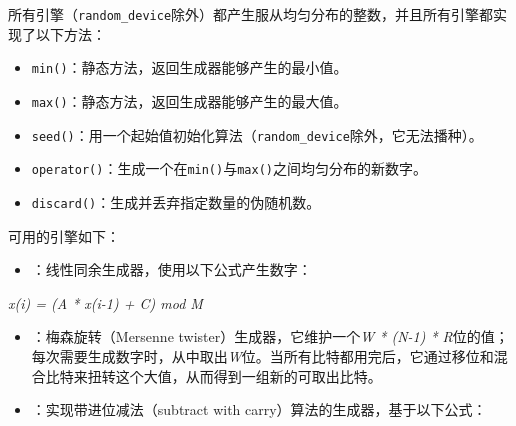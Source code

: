 
所有引擎（\texttt{random\_\allowbreak{}device}除外）都产生服从均匀分布的整数，并且所有引擎都实现了以下方法：



\begin{itemize}
\item \texttt{min()}：静态方法，返回生成器能够产生的最小值。



\item \texttt{max()}：静态方法，返回生成器能够产生的最大值。



\item \texttt{seed()}：用一个起始值初始化算法（\texttt{random\_\allowbreak{}device}除外，它无法播种）。



\item \texttt{operator()}：生成一个在\texttt{min()}与\texttt{max()}之间均匀分布的新数字。



\item \texttt{discard()}：生成并丢弃指定数量的伪随机数。

\end{itemize}



可用的引擎如下：



\begin{itemize}
\item {}：线性同余生成器，使用以下公式产生数字：

\end{itemize}



\textit{x(i) = (A * x(i-1) + C) mod M}



\begin{itemize}
\item {}：梅森旋转（Mersenne twister）生成器，它维护一个\textit{W * (N-1) * R}位的值；每次需要生成数字时，从中取出\textit{W}位。当所有比特都用完后，它通过移位和混合比特来扭转这个大值，从而得到一组新的可取出比特。



\item {}：实现带进位减法（subtract with carry）算法的生成器，基于以下公式：

\end{itemize}



